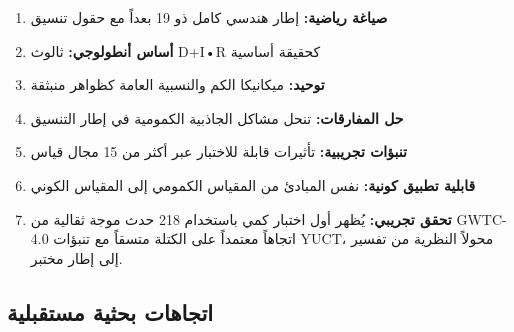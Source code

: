 \documentclass[11pt,a4paper]{article}
\theoremstyle{remark}
\begin{document}
	\begin{enumerate}
		\item \textbf{صياغة رياضية:} إطار هندسي كامل ذو 19 بعداً مع حقول تنسيق
		
		\item \textbf{أساس أنطولوجي:} ثالوث D+I•R كحقيقة أساسية
		
		\item \textbf{توحيد:} ميكانيكا الكم والنسبية العامة كظواهر منبثقة
		
		\item \textbf{حل المفارقات:} تنحل مشاكل الجاذبية الكمومية في إطار التنسيق
		
		\item \textbf{تنبؤات تجريبية:} تأثيرات قابلة للاختبار عبر أكثر من 15 مجال قياس
		
		\item \textbf{قابلية تطبيق كونية:} نفس المبادئ من المقياس الكمومي إلى المقياس الكوني
		
		\item \textbf{تحقق تجريبي:} يُظهر أول اختبار كمي باستخدام 218 حدث موجة ثقالية من GWTC-4.0 اتجاهاً معتمداً على الكتلة متسقاً مع تنبؤات YUCT، محولاً النظرية من تفسير إلى إطار مختبر.
	\end{enumerate}
	
	\subsection{اتجاهات بحثية مستقبلية}
	
\end{document}
